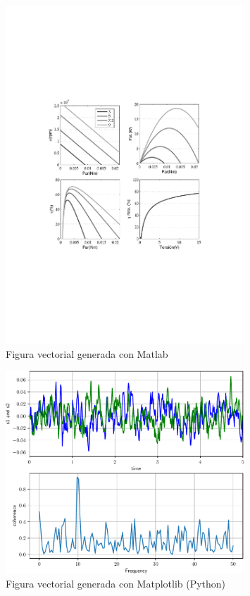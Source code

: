 \documentclass[11pt,a4paper]{article}
\begin{document}
\begin{figure}[H]
	\centering
	\includegraphics[width=0.8\textwidth]{../figs/matlabGrafs} 
	\caption[Gráfico de Matlab]{Figura vectorial generada con Matlab}
	\label{fig:matlabGrafs}
\end{figure}

\begin{figure}[H]
	\centering
	\includegraphics[width=0.8\textwidth]{../figs/fig2_py}
	\caption[Figura hecha desde Python]{Figura vectorial generada con Matplotlib (Python)}
	\label{fig:python}
\end{figure}
\end{document}
